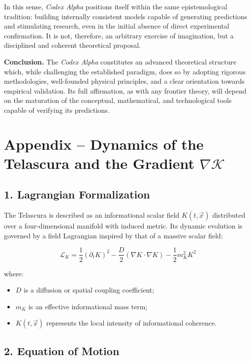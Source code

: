 \documentclass[12pt]{article}
\begin{document}
In this sense, \textit{Codex Alpha} positions itself within the same epistemological tradition: building internally consistent models capable of generating predictions and stimulating research, even in the initial absence of direct experimental confirmation. It is not, therefore, an arbitrary exercise of imagination, but a disciplined and coherent theoretical proposal.

\bigskip
\noindent
\textbf{Conclusion.} The \textit{Codex Alpha} constitutes an advanced theoretical structure which, while challenging the established paradigm, does so by adopting rigorous methodologies, well-founded physical principles, and a clear orientation towards empirical validation. Its full affirmation, as with any frontier theory, will depend on the maturation of the conceptual, mathematical, and technological tools capable of verifying its predictions.

\section*{Appendix – Dynamics of the Telascura and the Gradient $\nabla \mathcal{K}$}

\subsection*{1. Lagrangian Formalization}

The Telascura is described as an informational scalar field $K(t, \vec{x})$ distributed over a four-dimensional manifold with induced metric. Its dynamic evolution is governed by a field Lagrangian inspired by that of a massive scalar field:

\begin{equation}
\mathcal{L}_K = \frac{1}{2} \left( \partial_t K \right)^2 - \frac{D}{2} \left( \nabla K \cdot \nabla K \right) - \frac{1}{2} m_K^2 K^2
\end{equation}

where:

\begin{itemize}
  \item $D$ is a diffusion or spatial coupling coefficient;
  \item $m_K$ is an effective informational mass term;
  \item $K(t, \vec{x})$ represents the local intensity of informational coherence.
\end{itemize}

\subsection*{2. Equation of Motion}
\end{document}
